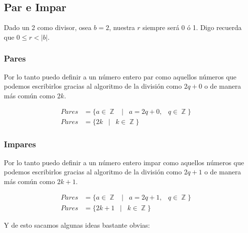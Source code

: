 \documentclass[12pt]{report}                                    %
\DeclareMathOperator \Space {\quad}                             %
\DeclareMathOperator \MiniSpace {\;}                            %
\newcommand \Such {\MiniSpace|\MiniSpace}                       %
\DeclareMathOperator \Integers  {\mathbb{Z}}                     %
\begin{document}
        \clearpage
        \subsection{Par e Impar}

            Dado un 2 como divisor, osea $b=2$, nuestra $r$ siempre será 0 ó 1.
            Digo recuerda que $0\leq r < |b|$.

            \subsubsection{Pares}
                Por lo tanto puedo definir a un número entero par como aquellos números
                que podemos escribirlos gracias al algoritmo de la división como
                $2q+0$ o de manera más común como $2k$.

                \begin{equation}
                \begin{split}
                    Pares &= \{a \in \Integers \Such a = 2q + 0, \MiniSpace q \in \Integers \}\\
                    Pares &= \{2k \Such k \in \Integers\}
                \end{split}
                \end{equation}

            \subsubsection{Impares}
                Por lo tanto puedo definir a un número entero impar como aquellos números
                que podemos escribirlos gracias al algoritmo de la división como
                $2q+1$ o de manera más común como $2k+1$.

                \begin{equation}
                \begin{split}
                    Pares &= \{a \in \Integers \Such a = 2q + 1, \MiniSpace q \in \Integers \}\\
                    Pares &= \{2k+1 \Such k \in \Integers\}
                \end{split}
                \end{equation}


            Y de esto sacamos algunas ideas bastante obvias:
\end{document}
